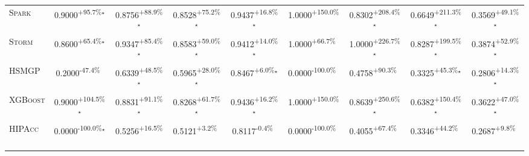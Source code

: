 \begin{table}[htbp]
\begin{tabular}{l|cccc|cccc}
\textsc{Spark} & \cellcolor{green!30}0.9000\textsuperscript{+95.7\%}$^\star$ & \cellcolor{green!30}0.8756\textsuperscript{+88.9\%}$^\star$ & \cellcolor{green!30}0.8528\textsuperscript{+75.2\%}$^\star$ & \cellcolor{green!30}0.9437\textsuperscript{+16.8\%}$^\star$ & \cellcolor{green!30}1.0000\textsuperscript{+150.0\%}$^{\,\,\,}$ & \cellcolor{green!30}0.8302\textsuperscript{+208.4\%}$^\star$ & \cellcolor{green!30}0.6649\textsuperscript{+211.3\%}$^\star$ & \cellcolor{green!30}0.3569\textsuperscript{+49.1\%}$^\star$ \\
\textsc{Storm} & \cellcolor{green!30}0.8600\textsuperscript{+65.4\%}$^\star$ & \cellcolor{green!30}0.9347\textsuperscript{+85.4\%}$^\star$ & \cellcolor{green!30}0.8583\textsuperscript{+59.0\%}$^\star$ & \cellcolor{green!30}0.9412\textsuperscript{+14.0\%}$^\star$ & \cellcolor{green!30}1.0000\textsuperscript{+66.7\%}$^{\,\,\,}$ & \cellcolor{green!30}1.0000\textsuperscript{+226.7\%}$^\star$ & \cellcolor{green!30}0.8287\textsuperscript{+199.5\%}$^\star$ & \cellcolor{green!30}0.3874\textsuperscript{+52.9\%}$^\star$ \\
\textsc{HSMGP} & \cellcolor{red!30}0.2000\textsuperscript{-47.4\%}$^{\,\,\,}$ & \cellcolor{green!30}0.6339\textsuperscript{+48.5\%}$^\star$ & \cellcolor{green!30}0.5965\textsuperscript{+28.0\%}$^\star$ & \cellcolor{green!30}0.8467\textsuperscript{+6.0\%}$^\star$ & \cellcolor{red!30}0.0000\textsuperscript{-100.0\%}$^{\,\,\,}$ & \cellcolor{green!30}0.4758\textsuperscript{+90.3\%}$^{\,\,\,}$ & \cellcolor{green!30}0.3325\textsuperscript{+45.3\%}$^\star$ & \cellcolor{green!30}0.2806\textsuperscript{+14.3\%}$^\star$ \\
\textsc{XGBoost} & \cellcolor{green!30}0.9000\textsuperscript{+104.5\%}$^\star$ & \cellcolor{green!30}0.8831\textsuperscript{+91.1\%}$^\star$ & \cellcolor{green!30}0.8268\textsuperscript{+61.7\%}$^\star$ & \cellcolor{green!30}0.9436\textsuperscript{+16.2\%}$^\star$ & \cellcolor{green!30}1.0000\textsuperscript{+150.0\%}$^{\,\,\,}$ & \cellcolor{green!30}0.8639\textsuperscript{+250.6\%}$^\star$ & \cellcolor{green!30}0.6382\textsuperscript{+150.4\%}$^\star$ & \cellcolor{green!30}0.3622\textsuperscript{+47.0\%}$^\star$ \\
\textsc{HIPAcc} & \cellcolor{red!30}0.0000\textsuperscript{-100.0\%}$^\star$ & \cellcolor{green!30}0.5256\textsuperscript{+16.5\%}$^{\,\,\,}$ & \cellcolor{green!30}0.5121\textsuperscript{+3.2\%}$^{\,\,\,}$ & \cellcolor{red!30}0.8117\textsuperscript{-0.4\%}$^{\,\,\,}$ & \cellcolor{red!30}0.0000\textsuperscript{-100.0\%}$^{\,\,\,}$ & \cellcolor{green!30}0.4055\textsuperscript{+67.4\%}$^{\,\,\,}$ & \cellcolor{green!30}0.3346\textsuperscript{+44.2\%}$^{\,\,\,}$ & \cellcolor{green!30}0.2687\textsuperscript{+9.8\%}$^{\,\,\,}$ \\

\end{tabular}
\end{table}
